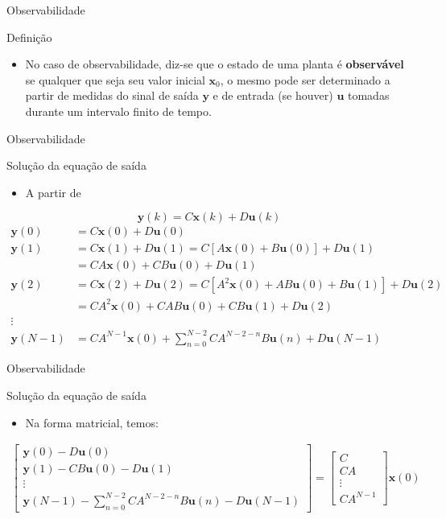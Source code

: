 \begin{frame}{Observabilidade}
\begin{block}{Definição}
\begin{itemize}
    \item No caso de observabilidade, diz-se que o estado de uma planta é \textbf{observável} se qualquer que seja seu valor inicial $\bm{x}_0$, o mesmo  pode ser determinado a partir de medidas do sinal de saída $\bm{y}$ e de entrada (se houver) $\bm{u}$ tomadas durante um intervalo finito de tempo.
\end{itemize}
\end{block}
\end{frame}

\begin{frame}{Observabilidade}
\begin{block}{Solução da equação de saída}
\begin{itemize}
    \item A partir de 
\end{itemize}
$$\bm{y}(k) = C\bm{x}(k) + D\bm{u}(k)$$
\begin{align*}
    \bm{y}(0) &= C\bm{x}(0) + D\bm{u}(0) \\
    \bm{y}(1) &= C\bm{x}(1) + D\bm{u}(1) = C[A\bm{x}(0) + B\bm{u}(0)] + D\bm{u}(1) \\
    &= CA\bm{x}(0) + CB\bm{u}(0) + D\bm{u}(1) \\
    \bm{y}(2) &= C\bm{x}(2) + D\bm{u}(2) = C[A^2\bm{x}(0) + AB\bm{u}(0) + B\bm{u}(1)] + D\bm{u}(2) \\
    &= CA^2\bm{x}(0) + CAB\bm{u}(0) + CB\bm{u}(1) + D\bm{u}(2) \\
    \vdots  \\
    \bm{y}(N-1) &= CA^{N-1}\bm{x}(0) + \sum_{n=0}^{N-2} CA^{N-2-n} B\bm{u}(n) + D\bm{u}(N-1)
\end{align*}
\end{block}
\end{frame}

\begin{frame}{Observabilidade}
\begin{block}{Solução da equação de saída}
\begin{itemize}
    \item Na forma matricial, temos:
\end{itemize}
\begin{align*}
\begin{bmatrix}
    \bm{y}(0) - D\bm{u}(0) \\
    \bm{y}(1) - CB\bm{u}(0) - D\bm{u}(1) \\
    \vdots  \\
    \bm{y}(N-1) - \sum_{n=0}^{N-2} CA^{N-2-n} B\bm{u}(n) - D\bm{u}(N-1)
\end{bmatrix}
=
\begin{bmatrix}
C \\
CA \\
\vdots \\
CA^{N-1}
\end{bmatrix}
\bm{x}(0)
\end{align*}
\end{block}
\end{frame}

